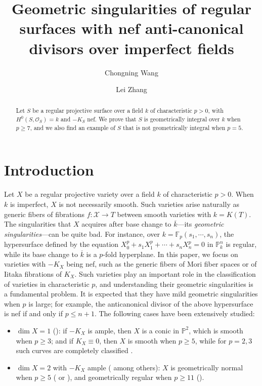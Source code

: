 \documentclass[reqno,oneside]{amsart}
\title[Geometric singularities of regular surfaces with nef anti-canonical divisors]%
      {Geometric singularities of regular surfaces with nef anti-canonical divisors over imperfect fields}
\author{Chongning Wang}
\author{Lei Zhang}
\theoremstyle{definition}
\theoremstyle{plain}
\numberwithin{equation}{section}
\begin{document}
\begin{abstract}
Let $S$ be a regular projective surface over a field $k$ of characteristic $p>0$, with $H^0(S,\mathcal{O}_S)=k$ and $-K_S$ nef.  We prove that $S$ is geometrically integral over $k$ when $p\geq 7$, and we also find an example of $S$ that is not geometrically integral when $p=5$.
\end{abstract}

\maketitle
\section{Introduction}\label{section-intro}
Let $X$ be a regular projective variety over a field $k$ of characteristic $p>0$.
When $k$ is imperfect, $X$ is not necessarily smooth.
Such varieties arise naturally as generic fibers of fibrations $f\colon\mathcal X\to T$ between smooth varieties with $k=K(T)$.
The singularities that $X$ acquires after base change to $\overline k$---its \emph{geometric singularities}---can be quite bad.
For instance, over $k=\mathbb F_p(s_1,\cdots, s_n)$, the hypersurface defined by the equation $X_0^p+s_1X_1^p+\cdots + s_nX_n^p=0$ in $\mathbb{P}_k^n$ is regular, while its base change to 
$\overline k$ is a $p$-fold hyperplane.
In this paper, we focus on varieties with $-K_X$ being nef, such as the generic fibers of Mori fiber spaces or of Iitaka fibrations of $K_X$.
Such varieties play an important role in the classification of varieties in characteristic $p$, and understanding their geometric singularities is a fundamental problem.
It is expected that they have mild geometric singularities when $p$ is large; for example, the anticanonical divisor of the above hypersurface is nef if and only if $p\leq n+1$.
The following cases have been extensively studied:
\begin{itemize}
  \item $\dim X = 1$ (\cite{Queen-71-I,schroer_fibration_2010,tanaka_invariants_2021,Schroer2211}):
    if $-K_X$ is ample, then $X$ is a conic in $\mathbb{P}^2$, which is smooth when $p\geq 3$;
    and if $K_X \equiv 0$, then $X$ is smooth when $p\geq 5$, while for $p=2,3$ such curves are completely classified \cite{Schroer2211}.
  \item $\dim X = 2$ with $-K_X$ ample (\cite{Mori-Saito-03Wild, Patakfalvi-Waldron-2022, Fanelli-Schroer-2020, Bernasconi-Tanaka-22, Bernasconi-Martin-2024-Bounding, BT2408} among others): $X$ is geometrically normal when $p\ge5$ (\cite[Theorem~1.5]{Patakfalvi-Waldron-2022} or \cite[Theorem~3.7]{Bernasconi-Tanaka-22}), and geometrically regular when $p\ge11$ (\cite[Proposition~5.2]{Bernasconi-Tanaka-22}).
\end{itemize}
\end{document}
